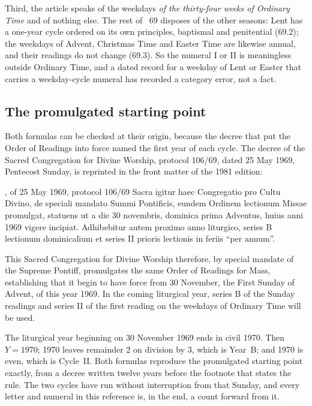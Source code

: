 Third, the article speaks of the weekdays \emph{of the thirty-four weeks of Ordinary Time} and of
nothing else. The rest of ~69 disposes of the other seasons: Lent has a one-year cycle
ordered on its own principles, baptismal and penitential (69.2); the weekdays of Advent, Christmas
Time and Easter Time are likewise annual, and their readings do not change (69.3). So the numeral
I or II is meaningless outside Ordinary Time, and a dated record for a weekday of Lent or Easter that
carries a weekday-cycle numeral has recorded a category error, not a fact.

\subsection{The promulgated starting point}

Both formulas can be checked at their origin, because the decree that put the Order of Readings into
force named the first year of each cycle. The decree of the Sacred Congregation for Divine Worship,
protocol 106/69, dated 25 May 1969, Pentecost Sunday, is reprinted in the front matter of the 1981
edition:

\begin{normtext}{,  of 25 May 1969, protocol 106/69}
Sacra igitur haec Congregatio pro Cultu Divino, de speciali mandato Summi Pontificis, eundem Ordinem
lectionum Missae promulgat, statuens ut a die 30 novembris, dominica prima Adventus, huius anni 1969
vigere incipiat. Adhibebitur autem proximo anno liturgico, series B lectionum dominicalium et series
II prioris lectionis in feriis ``per annum''.
\end{normtext}

\begin{workingrendering}
This Sacred Congregation for Divine Worship therefore, by special mandate of the Supreme Pontiff,
promulgates the same Order of Readings for Mass, establishing that it begin to have force from 30
November, the First Sunday of Advent, of this year 1969. In the coming liturgical year, series B of
the Sunday readings and series II of the first reading on the weekdays of Ordinary Time will be used.
\end{workingrendering}

The liturgical year beginning on 30 November 1969 ends in civil 1970. Then $Y = 1970$;
1970 leaves remainder 2 on division by 3, which is Year~B; and 1970 is even, which is Cycle~II. Both formulas reproduce the
promulgated starting point exactly, from a decree written twelve years before the footnote that
states the rule. The two cycles have run without interruption from that Sunday, and every letter and
numeral in this reference is, in the end, a count forward from it.

